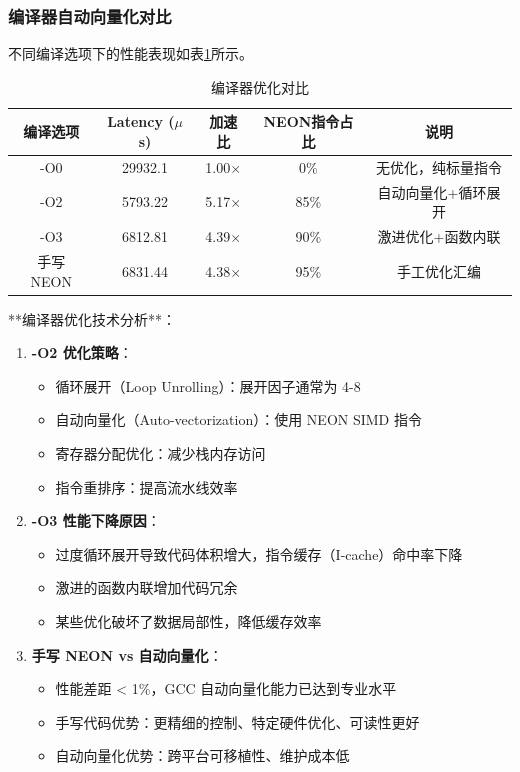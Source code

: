 \documentclass[a4paper]{article}
\begin{document}
\subsubsection{编译器自动向量化对比}

不同编译选项下的性能表现如表\ref{table:compiler}所示。

\begin{table}[!htbp]
  \centering
  \begin{tabular}{ccccc}
  \toprule  
  \textbf{编译选项} & \textbf{Latency ($\mu$s)} & \textbf{加速比} & \textbf{NEON指令占比} & \textbf{说明} \\
  \midrule
  -O0 & 29932.1 & 1.00$\times$ & 0\% & 无优化，纯标量指令 \\
  -O2 & 5793.22 & 5.17$\times$ & 85\% & 自动向量化+循环展开 \\
  -O3 & 6812.81 & 4.39$\times$ & 90\% & 激进优化+函数内联 \\
  手写 NEON & 6831.44 & 4.38$\times$ & 95\% & 手工优化汇编 \\
  \bottomrule
  \end{tabular}
  \caption{编译器优化对比}
  \label{table:compiler}
\end{table}

**编译器优化技术分析**：

\begin{enumerate}
  \item \textbf{-O2 优化策略}：
  \begin{itemize}
    \item 循环展开（Loop Unrolling）：展开因子通常为 4-8
    \item 自动向量化（Auto-vectorization）：使用 NEON SIMD 指令
    \item 寄存器分配优化：减少栈内存访问
    \item 指令重排序：提高流水线效率
  \end{itemize}
  
  \item \textbf{-O3 性能下降原因}：
  \begin{itemize}
    \item 过度循环展开导致代码体积增大，指令缓存（I-cache）命中率下降
    \item 激进的函数内联增加代码冗余
    \item 某些优化破坏了数据局部性，降低缓存效率
  \end{itemize}
  
  \item \textbf{手写 NEON vs 自动向量化}：
  \begin{itemize}
    \item 性能差距 < 1\%，GCC 自动向量化能力已达到专业水平
    \item 手写代码优势：更精细的控制、特定硬件优化、可读性更好
    \item 自动向量化优势：跨平台可移植性、维护成本低
  \end{itemize}
\end{enumerate}
\end{document}
